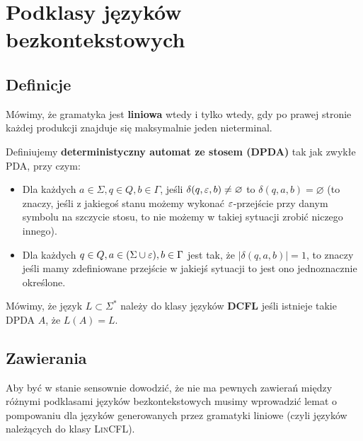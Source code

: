 \section{Podklasy języków bezkontekstowych}
\label{cfl-subclassses}

\subsection{Definicje}

\begin{definition}  
    Mówimy, że gramatyka jest \textbf{liniowa} wtedy i tylko wtedy, gdy po prawej stronie każdej produkcji znajduje się maksymalnie jeden nieterminal.
\end{definition}

\begin{definition}
    Definiujemy \textbf{deterministyczny automat ze stosem (DPDA)} tak jak zwykłe PDA, przy czym:
    
    \begin{itemize}
        \item Dla każdych \( a \in \Sigma, q \in Q, b \in \Gamma \), jeśli \( \delta(q, \varepsilon, b) \not = \varnothing \) to \( \delta(q, a, b) = \varnothing \) (to znaczy, jeśli z jakiegoś stanu możemy wykonać \(\varepsilon\)-przejście przy danym symbolu na szczycie stosu, to nie możemy w takiej sytuacji zrobić niczego innego).
        \item Dla każdych \( q \in Q, a \in (\Sigma \cup \varepsilon) , b \in \Gamma \) jest tak, że \( |\delta(q, a, b)| = 1\), to znaczy jeśli mamy zdefiniowane przejście w jakiejś sytuacji to jest ono jednoznacznie określone. 
    \end{itemize}
\end{definition}

\begin{definition}
    Mówimy, że język \(L \subset \Sigma^*\) należy do klasy języków \textbf{DCFL} jeśli istnieje takie DPDA \(A\), że \(L(A) = L\).
\end{definition}

\subsection{Zawierania}

Aby być w stanie sensownie dowodzić, że nie ma pewnych zawierań między różnymi podklasami języków bezkontekstowych musimy wprowadzić lemat o pompowaniu dla języków generowanych przez gramatyki liniowe (czyli języków należących do klasy \textsc{LinCFL}).

